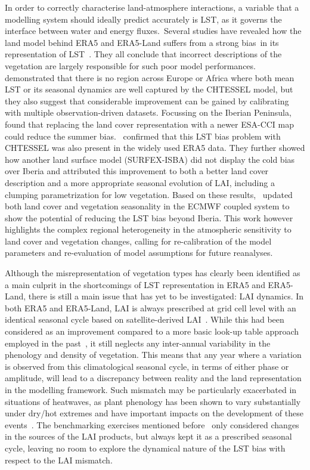 \documentclass[gmd, manuscript]{copernicus}
\begin{document}
{In order to correctly characterise land-atmosphere interactions, a
variable that a modelling system should ideally predict accurately is
LST, as it governs the interface between water and energy
fluxes.~}Several studies have revealed how the land model behind ERA5
and ERA5-Land suffers from a strong bias~in its representation of
LST~\citep{Johannsen_2019,Nogueira_2020,Orth_2017}. They all conclude that incorrect 
descriptions
of 
the vegetation are largely responsible for such poor model
performances.~\citet{Orth_2017} demonstrated that there is no region
across Europe or Africa where both mean LST or its seasonal dynamics are
well captured by the CHTESSEL model, but they also suggest that
considerable improvement can be gained by calibrating with multiple
observation-driven datasets. Focussing on the Iberian
Peninsula,~\citet{Johannsen_2019} found that replacing the land cover
representation with a newer ESA-CCI map could reduce the summer
bias.~\citet{Nogueira_2020} confirmed that this LST bias problem with
CHTESSEL was also present in the widely used ERA5 data. They further
showed how another land surface model (SURFEX-ISBA) did not display the
cold bias over Iberia and attributed this improvement to both a better
land cover description and a more appropriate seasonal evolution of
LAI, including a clumping parametrization for low vegetation. Based on
these results,~\citet{Nogueira_2021} updated both land cover and
vegetation seasonality in the ECMWF coupled system to show the potential
of reducing the LST bias beyond Iberia. This work however highlights
the complex regional heterogeneity in the atmospheric sensitivity to
land cover and vegetation changes, calling for re-calibration of the
model parameters and re-evaluation of model assumptions for future
reanalyses.

Although the misrepresentation of vegetation types has clearly been
identified as a main culprit in the shortcomings of LST representation
in ERA5 and ERA5-Land, there is still a main issue that has yet to be
investigated: LAI dynamics. In both ERA5 and ERA5-Land, LAI is always
prescribed at grid cell level with an identical seasonal cycle based on
satellite-derived LAI~\citep{Boussetta_2012}. While this had been
considered as an improvement compared to a more basic look-up table
approach employed in the past~\citep{Boussetta_2012}, it still neglects any
inter-annual variability in the phenology and density of vegetation.
This means that any year where a variation is observed from this
climatological seasonal cycle, in terms of either phase or amplitude,
will lead to a discrepancy between reality and the land representation
in the modelling framework. Such mismatch may be particularly
exacerbated in situations of heatwaves, as plant phenology has been
shown to vary substantially under dry/hot extremes and have important
impacts on the development of these events~\citep{stefanon2012effects, 
skinner2018amplificationa, 
Lorenz_2013}. The benchmarking exercises mentioned 
before~\citep{Johannsen_2019,Nogueira_2020,Nogueira_2021} 
only considered changes in the sources of the LAI products, but always kept
it as a prescribed seasonal cycle, leaving no room to explore the
dynamical nature of the LST bias with respect to the LAI
mismatch.
\end{document}
